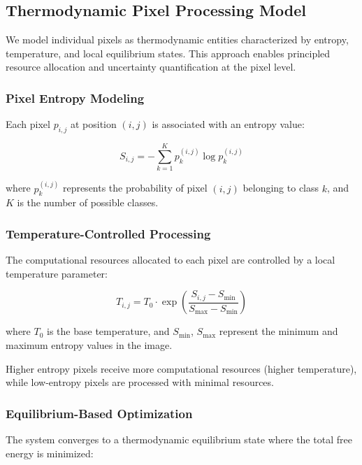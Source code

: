 \documentclass[12pt,a4paper]{article}
\begin{document}
\subsection{Thermodynamic Pixel Processing Model}

We model individual pixels as thermodynamic entities characterized by entropy, temperature, and local equilibrium states. This approach enables principled resource allocation and uncertainty quantification at the pixel level.

\subsubsection{Pixel Entropy Modeling}

Each pixel $p_{i,j}$ at position $(i,j)$ is associated with an entropy value:

\begin{equation}
S_{i,j} = -\sum_{k=1}^{K} p_k^{(i,j)} \log p_k^{(i,j)}
\end{equation}

where $p_k^{(i,j)}$ represents the probability of pixel $(i,j)$ belonging to class $k$, and $K$ is the number of possible classes.

\subsubsection{Temperature-Controlled Processing}

The computational resources allocated to each pixel are controlled by a local temperature parameter:

\begin{equation}
T_{i,j} = T_0 \cdot \exp\left(\frac{S_{i,j} - S_{\min}}{S_{\max} - S_{\min}}\right)
\end{equation}

where $T_0$ is the base temperature, and $S_{\min}$, $S_{\max}$ represent the minimum and maximum entropy values in the image.

Higher entropy pixels receive more computational resources (higher temperature), while low-entropy pixels are processed with minimal resources.

\subsubsection{Equilibrium-Based Optimization}

The system converges to a thermodynamic equilibrium state where the total free energy is minimized:
\end{document}

